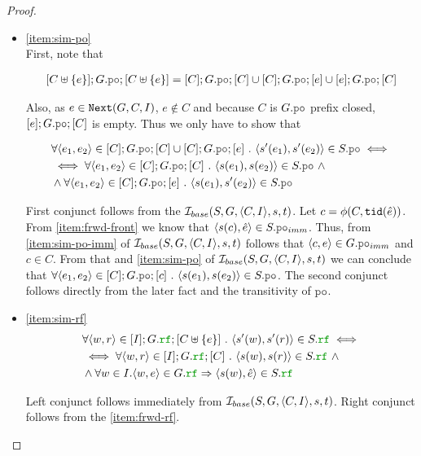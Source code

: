 \documentclass[12pt]{article}
\begin{document}
\begin{proof}
\begin{itemize}
  \item \ref{item:sim-po} \\
    First, note that 
    
    \begin{equation*}
      \begin{split}
        [C \uplus \{e\}];G.\lPO;[C \uplus \{e\}] =
          [C];G.\lPO;[C] \cup [C];G.\lPO;[e] \cup [e];G.\lPO;[C]
      \end{split}
    \end{equation*}

    Also, as $e \in {\mathtt{Next}}(G, C, I)$, $e \not\in C$ and
    because $C$ is $G.\lPO$ prefix closed, $[e];G.\lPO;[C]$ is empty.
    Thus we only have to show that

    \begin{equation*}
      \begin{split}
        & \forall{\tup{e_1, e_2} \in [C];G.\lPO;[C] \cup [C];G.\lPO;[e]} ~.~
            \tup{s'(e_1), s'(e_2)} \in S.\lPO \iff \\
        & \iff
          \forall{\tup{e_1, e_2} \in [C];G.\lPO;[C]} ~.~ \tup{s(e_1), s(e_2)} \in S.\lPO ~ \wedge \\
        & \wedge
          \forall{\tup{e_1, e_2} \in [C];G.\lPO;[e]} ~.~ \tup{s(e_1), s'(e_2)} \in S.\lPO
      \end{split}
    \end{equation*}

    First conjunct follows from the $\mathcal{I}_{base}(S, G, \langle C, I \rangle, s, t)$.
    Let $c = \phi(C, {\mathtt{tid}}(\hat{e}))$. 
    From \ref{item:frwd-front} we know that $\tup{s(c), \hat{e}} \in S.\lPO_{imm}$.
    Thus, from \ref{item:sim-po-imm} of $\mathcal{I}_{base}(S, G, \langle C, I \rangle, s, t)$
    follows that $\tup{c, e} \in G.\lPO_{imm}$ and $c \in C$.
    From that and \ref{item:sim-po} of $\mathcal{I}_{base}(S, G, \langle C, I \rangle, s, t)$
    we can conclude that
    $\forall{\tup{e_1, e_2} \in [C];G.\lPO;[c]} ~.~ \tup{s(e_1), s(e_2)} \in S.\lPO$.
    The second conjunct follows directly from the later fact and the transitivity of $\lPO$.

  \item \ref{item:sim-rf} \\
    
    \begin{equation*}
      \begin{split}
        & \forall{\tup{w, r} \in [I];G.\lRF;[C \uplus \{e\}]} ~.~
          \tup{s'(w), s'(r)} \in S.\lRF \iff \\
        & \iff \forall{\tup{w, r} \in [I];G.\lRF;[C]} ~.~ \tup{s(w), s(r)} \in S.\lRF ~ \wedge \\
        & \wedge \forall{w \in I}. \tup{w, e} \in G.\lRF \Rightarrow \tup{s(w), \hat{e}} \in S.\lRF
      \end{split}
    \end{equation*}

    Left conjunct follows immediately from $\mathcal{I}_{base}(S, G, \langle C, I \rangle, s, t)$.
    Right conjunct follows from the \ref{item:frwd-rf}.
    
  \end{itemize}
  
\end{proof}
\end{document}
